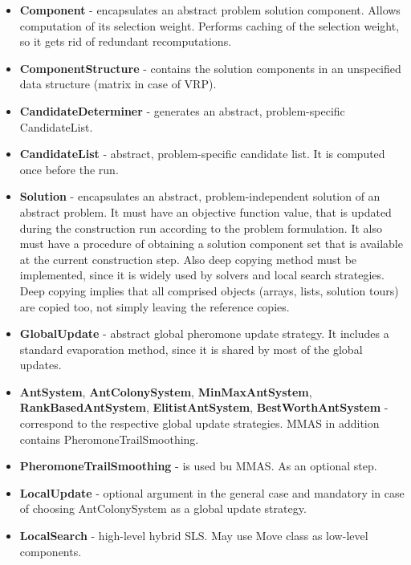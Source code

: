 \documentclass[12pt,a4paper,oneside]{book}
\begin{document}
\begin{itemize}
\item \textbf{Component} - encapsulates an abstract problem solution component. Allows computation of its selection weight. Performs caching of the selection weight, so it gets rid of redundant recomputations.

\item \textbf{ComponentStructure} - contains the solution components in an unspecified data structure (matrix in case of VRP).

\item \textbf{CandidateDeterminer} - generates an abstract, problem-specific CandidateList.

\item \textbf{CandidateList} - abstract, problem-specific candidate list. It is computed once before the run.

\item \textbf{Solution} - encapsulates an abstract, problem-independent solution of an abstract problem. It must have an objective function value, that is updated during the construction run according to the problem formulation. It also must have a procedure of obtaining a solution component set that is available at the current construction step. Also deep copying method must be implemented, since it is widely used by solvers and local search strategies. Deep copying implies that all comprised objects (arrays, lists, solution tours) are copied too, not simply leaving the reference copies.

\item \textbf{GlobalUpdate} - abstract global pheromone update strategy. It includes a standard evaporation method, since it is shared by most of the global updates.

\item \textbf{AntSystem}, \textbf{AntColonySystem}, \textbf{MinMaxAntSystem}, \textbf{RankBasedAntSystem}, \textbf{ElitistAntSystem}, \textbf{BestWorthAntSystem} - correspond to the respective global update strategies. MMAS in addition contains PheromoneTrailSmoothing.

\item \textbf{PheromoneTrailSmoothing} - is used bu MMAS. As an optional step.

\item \textbf{LocalUpdate} - optional argument in the general case and mandatory in case of choosing AntColonySystem as a global update strategy.

\item \textbf{LocalSearch} - high-level hybrid SLS. May use Move class as low-level components.


\end{itemize}
\end{document}
